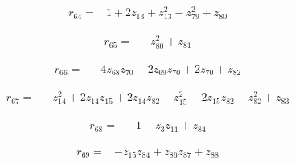 \par\noindent\begin{minipage}{\linewidth}
\begin{align*}
r_{64}={}&1+2z_{13}+z_{13}^{2}-z_{79}^{2}+z_{80}
\end{align*}
\end{minipage}\par
\par\noindent\begin{minipage}{\linewidth}
\begin{align*}
r_{65}={}&-z_{80}^{2}+z_{81}
\end{align*}
\end{minipage}\par
\par\noindent\begin{minipage}{\linewidth}
\begin{align*}
r_{66}={}&-4z_{68}z_{70}-2z_{69}z_{70}+2z_{70}+z_{82}
\end{align*}
\end{minipage}\par
\par\noindent\begin{minipage}{\linewidth}
\begin{align*}
r_{67}={}&-z_{14}^{2}+2z_{14}z_{15}+2z_{14}z_{82}-z_{15}^{2}-2z_{15}z_{82}-z_{82}^{2}+z_{83}
\end{align*}
\end{minipage}\par
\par\noindent\begin{minipage}{\linewidth}
\begin{align*}
r_{68}={}&-1-z_{3}z_{11}+z_{84}
\end{align*}
\end{minipage}\par
\par\noindent\begin{minipage}{\linewidth}
\begin{align*}
r_{69}={}&-z_{15}z_{84}+z_{86}z_{87}+z_{88}
\end{align*}
\end{minipage}\par
